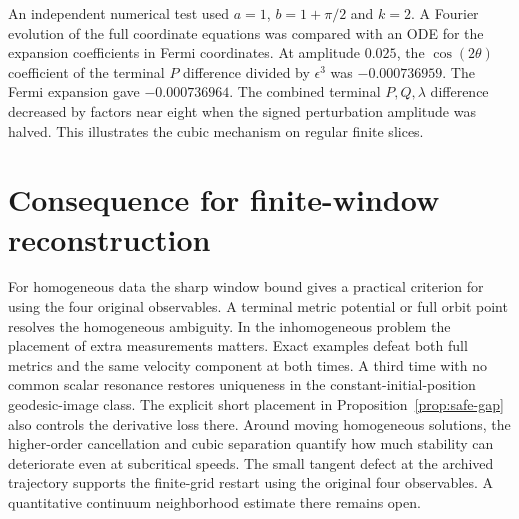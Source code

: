 \documentclass[11pt]{article}
\begin{document}
An independent numerical test used $a=1$, $b=1+\pi/2$ and $k=2$.
A Fourier evolution of the full coordinate equations was compared
with an ODE for the expansion coefficients in Fermi coordinates.
At amplitude $0.025$, the $\cos(2\theta)$ coefficient of the terminal
$P$ difference divided by $\epsilon^3$ was $-0.000736959$.
The Fermi expansion gave $-0.000736964$. The combined terminal
$P,Q,\lambda$ difference decreased by factors near eight when
the signed perturbation amplitude was halved.
This illustrates the cubic mechanism on regular finite slices.



\section{Consequence for finite-window reconstruction}
For homogeneous data the sharp window bound gives a practical
criterion for using the four original observables. A terminal
metric potential or full orbit point resolves the homogeneous
ambiguity. In the inhomogeneous problem the placement of extra
measurements matters. Exact examples defeat both full metrics
and the same velocity component at both times. A third time
with no common scalar resonance restores uniqueness in the
constant-initial-position geodesic-image class. The explicit
short placement in Proposition~\ref{prop:safe-gap} also
controls the derivative loss there.
Around moving homogeneous solutions, the higher-order
cancellation and cubic separation quantify how much stability
can deteriorate even at subcritical speeds.
The small tangent defect at the archived trajectory supports
the finite-grid restart using the original four observables.
A quantitative continuum neighborhood estimate there remains
open.
\end{document}
